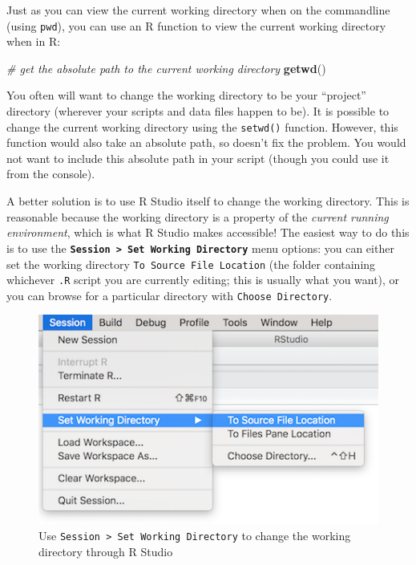 \documentclass[]{book}
\newenvironment{Shaded}{\begin{snugshade}}{\end{snugshade}}
\newcommand{\KeywordTok}[1]{\textcolor[rgb]{0.13,0.29,0.53}{\textbf{#1}}}
\newcommand{\CommentTok}[1]{\textcolor[rgb]{0.56,0.35,0.01}{\textit{#1}}}
\newcommand{\NormalTok}[1]{#1}
\theoremstyle{definition}
\theoremstyle{definition}
\theoremstyle{remark}
\begin{document}
Just as you can view the current working directory when on the
commandline (using \texttt{pwd}), you can use an R function to view the
current working directory when in R:

\begin{Shaded}
\begin{Highlighting}[]
\CommentTok{# get the absolute path to the current working directory}
\KeywordTok{getwd}\NormalTok{()}
\end{Highlighting}
\end{Shaded}

You often will want to change the working directory to be your
``project'' directory (wherever your scripts and data files happen to
be). It is possible to change the current working directory using the
\texttt{setwd()} function. However, this function would also take an
absolute path, so doesn't fix the problem. You would not want to include
this absolute path in your script (though you could use it from the
console).

A better solution is to use R Studio itself to change the working
directory. This is reasonable because the working directory is a
property of the \emph{current running environment}, which is what R
Studio makes accessible! The easiest way to do this is to use the
\textbf{\texttt{Session\ \textgreater{}\ Set\ Working\ Directory}} menu
options: you can either set the working directory
\texttt{To\ Source\ File\ Location} (the folder containing whichever
\texttt{.R} script you are currently editing; this is usually what you
want), or you can browse for a particular directory with
\texttt{Choose\ Directory}.

\begin{figure}
\centering
\includegraphics{img/dataframes/session-setwd-rstudio.png}
\caption{Use \texttt{Session\ \textgreater{}\ Set\ Working\ Directory}
to change the working directory through R Studio}
\end{figure}
\end{document}

